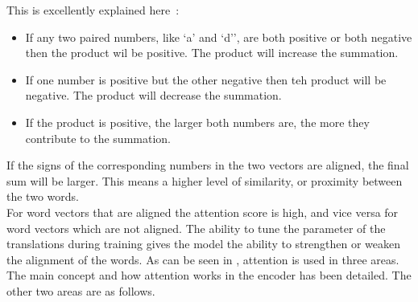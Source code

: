 This is excellently explained here~\autocite{doshiTransformersExplainedVisually2021b}:
\begin{itemize}
	\item If any two paired numbers, like `a' and `d'', are both positive or both negative then the product wil be positive. The product will
	      increase the summation.
	\item If one number is positive but the other negative then teh product will be negative. The product will decrease the summation.
	\item If the product is positive, the larger both numbers are, the more they contribute to the summation.
\end{itemize}
If the signs of the corresponding numbers in the two vectors are aligned, the final sum will be larger. This means a higher level of similarity,
or proximity between the two words.\\
For word vectors that are aligned the attention score is high, and vice versa for word vectors which are not aligned.
The ability to tune the parameter of the translations during training gives the model the ability to strengthen or weaken the alignment of the
words.
\bigbreak
As can be seen in , attention is used in three areas. The main concept and how attention works in the encoder has
been detailed. The other two areas are as follows.
